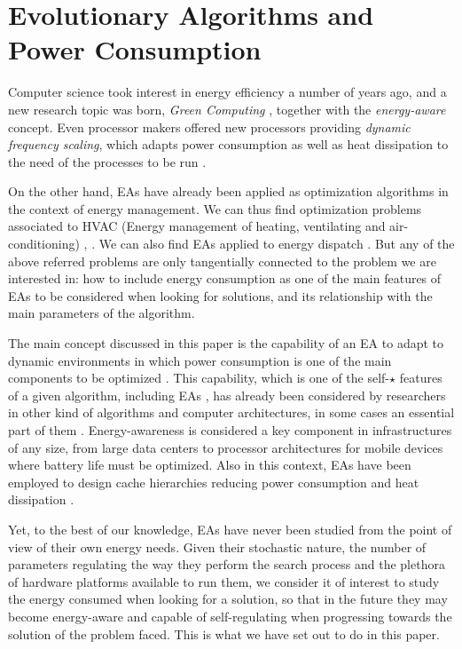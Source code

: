 \section{Evolutionary Algorithms and Power Consumption}
\label{eas}

Computer science took interest in energy efficiency a number of years
ago, and a new research topic was born, \textit{Green Computing}
\cite{hooper2008}, together with the \textit{energy-aware}
\cite{barroso2007,energy-aware} concept. Even processor 
makers offered new processors providing \textit{dynamic frequency
  scaling}, which adapts power consumption as well as heat dissipation
to the need of the processes to be run \cite{Bansal2004,albers2011,energy-efficient}. 

On the other hand, EAs have already been applied as optimization
algorithms in the context of energy management.  We can thus find
optimization problems associated to HVAC (Energy management of
heating, ventilating and air-conditioning) \cite{Fong2006},
\cite{Lee2011}.  We can also find EAs applied to energy dispatch
\cite{Fadaee2012}.  But any of the above referred problems are only
tangentially connected to the problem we are interested in:  how to
include energy consumption as one of the main features of EAs to be
considered when looking for solutions, and its relationship with the
main parameters of the algorithm. 

The main concept discussed in this paper is the capability of an EA to adapt
to dynamic environments in which power consumption is one of the main
components to be optimized \cite{ephemeral2015}. This capability, which
is one of the self-$\star$ features of a
given algorithm, including EAs \cite{ephemeral2015}, has already been
considered by researchers in other kind of algorithms and computer architectures, in some cases
an essential part of them \cite{energy-aware}. Energy-awareness is
considered a key
component in infrastructures of any size, from large data centers to
processor architectures for mobile devices where battery life must be
optimized.  Also in this context, EAs have been employed to design
cache hierarchies reducing power consumption and heat dissipation
\cite{DiazAlvarez2016}. 

Yet, to the best of our knowledge, EAs have never been studied from
the point of view of their own energy needs. 
Given their stochastic nature, the number of parameters regulating the
way they perform the search process and the plethora of hardware
platforms available to run them, we consider it of interest to study
the energy consumed when looking for a solution, so that in the future
they may become energy-aware and capable of self-regulating when
progressing towards the solution of the problem faced. This is what we
have set out to do in this paper.

